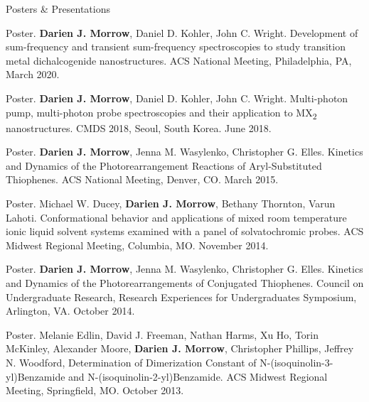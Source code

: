 \documentclass{resume} %
\begin{document}
\begin{rSection}{Posters \& Presentations}
	
	
\begin{etaremune}
	\item Poster. \textbf{Darien J. Morrow}, Daniel D. Kohler, John C. Wright. Development of sum-frequency and transient sum-frequency spectroscopies to study transition metal dichalcogenide nanostructures. ACS National Meeting, Philadelphia, PA, March 2020. 
	
	\item Poster. \textbf{Darien J. Morrow}, Daniel D. Kohler, John C. Wright. Multi-photon pump, multi-photon probe spectroscopies and their application to MX\textsubscript{2} nanostructures. CMDS 2018, Seoul, South Korea. June 2018.

	\item Poster. \textbf{Darien J. Morrow}, Jenna M. Wasylenko, Christopher G. Elles. Kinetics and
	Dynamics of the Photorearrangement Reactions of Aryl-Substituted Thiophenes. ACS National Meeting, Denver, CO. March 2015. 
	
	\item Poster. Michael W. Ducey, \textbf{Darien J. Morrow}, Bethany Thornton, Varun Lahoti. Conformational behavior and applications of mixed room temperature ionic liquid solvent systems examined with a panel of solvatochromic probes. ACS Midwest Regional Meeting, Columbia, MO. November 2014.
	
	\item Poster. \textbf{Darien J. Morrow}, Jenna M. Wasylenko, Christopher G. Elles. Kinetics and Dynamics of the Photorearrangements of Conjugated Thiophenes. Council on Undergraduate Research, Research Experiences for Undergraduates Symposium, Arlington, VA. October 2014.
	
	
	
	\item Poster. Melanie Edlin, David J. Freeman, Nathan Harms, Xu Ho, Torin McKinley, Alexander Moore, \textbf{Darien J. Morrow}, Christopher Phillips, Jeffrey N. Woodford, Determination of Dimerization Constant of N-(isoquinolin-3-yl)Benzamide and N-(isoquinolin-2-yl)Benzamide. ACS Midwest Regional Meeting, Springfield, MO. October 2013.
	

\end{etaremune}
\end{rSection}
\end{document}
